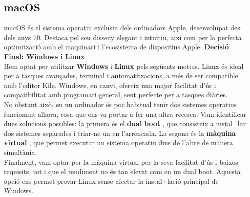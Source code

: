 \subsection{macOS}

\label{subsec:Mac OS}
macOS és el sistema operatiu exclusiu dels ordinadors Apple, desenvolupat des dels anys 70. Destaca pel seu disseny elegant i intuïtiu, així com per la perfecta optimització amb el maquinari i l’ecosistema de dispositius Apple.
\textbf{Decisió Final: Windows i Linux}\\
Hem optat per utilitzar \textbf{Windows} i \textbf{Linux} pels següents motius. Linux és ideal per a tasques avançades, terminal i automatitzacions, a més de ser compatible amb l’editor Kile. Windows, en canvi, ofereix una major facilitat d’ús i compatibilitat amb programari general, sent perfecte per a tasques diàries.\\

No obstant això, en un ordinador és poc habitual tenir dos sistemes operatius funcionant alhora, cosa que ens va portar a fer una altra recerca. Vam identificar dues solucions possibles: la primera és el \textbf{dual boot} \cite{DualBoot}, que consisteix a instal·lar dos sistemes separades i triar-ne un en l’arrencada. La segona és la \textbf{màquina virtual} \cite{MàquinaVirtual}, que permet executar un sistema operatiu dins de l’altre de manera simultània.\\

Finalment, vam optar per la màquina virtual per la seva facilitat d’ús i baixos requisits, tot i que el rendiment no és tan elevat com en un dual boot. Aquesta opció ens permet provar Linux sense afectar la instal·lació principal de Windows.












